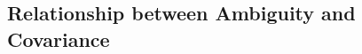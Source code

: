 \documentclass[../main.tex]{subfiles}
\begin{document}


\subsection{Relationship between Ambiguity and Covariance}

\end{document}
